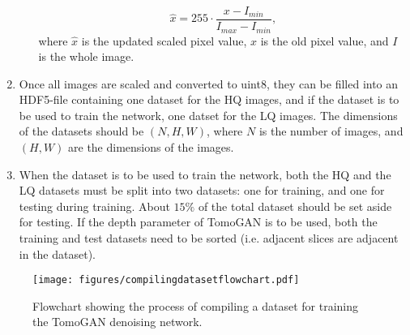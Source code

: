 \begin{enumerate}
\begin{enumerate}
        \begin{equation}
            \label{eq:scaleimages}
            \hat{x} = 255 \cdot \frac{x - I_{min}}{I_{max} - I_{min}},
        \end{equation}
        where $\hat{x}$ is the updated scaled pixel value, $x$ is the old pixel value, and $I$ is the whole image.
    \end{enumerate}
    \item Once all images are scaled and converted to uint8, they can be filled into an HDF5-file containing one dataset for the HQ images, and if the dataset is to be used to train the network, one datset for the LQ images. The dimensions of the datasets should be $(N,H,W)$, where $N$ is the number of images, and $(H,W)$ are the dimensions of the images. 
    \item When the dataset is to be used to train the network, both the HQ and the LQ datasets must be split into two datasets: one for training, and one for testing during training. About $15\%$ of the total dataset should be set aside for testing. If the depth parameter of TomoGAN is to be used, both the training and test datasets need to be sorted (i.e. adjacent slices are adjacent in the dataset). 
\end{enumerate}


\begin{figure}[htbp]  
    \centering
    \texttt{[image: figures/compilingdatasetflowchart.pdf]}
    \caption[Dataset creation flowchart]{Flowchart showing the process of compiling a dataset for training the TomoGAN denoising network. }
    \label{fig:compilingdatasetflowchart}
\end{figure}
